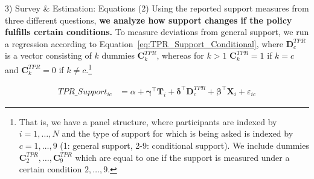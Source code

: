 \documentclass{beamer}
\begin{document}
\begin{frame}{3) Survey \& Estimation: Equations (2)} 
\label{equations2}
Using the reported support measures from three different questions, \textbf{we analyze how support changes if the policy fulfills certain conditions.} To measure deviations from general support, we run a regression according to Equation~\ref{eq:TPR_Support_Conditional}, where %
$\mathbf{D}_c^{TPR}$ is a vector consisting of $k$ dummies $\mathbf{C}_k^{TPR}$, whereas for $k>1$ $\mathbf{C}_k^{TPR}=1$ if $k=c$ and $\mathbf{C}_k^{TPR}=0$ if $k \neq c$.\footnote[7]{That is, we have a panel structure, where participants are indexed by $i=1,\ldots,N$ and the type of support for which is being asked is indexed by $c=1,\ldots,9$ (1: general support, 2-9: conditional support). We include dummies $\mathbf{C}_2^{TPR},\ldots, \mathbf{C}_9^{TPR}$ which are equal to one if the support is measured under a certain condition $2,\ldots,9$.}
\vspace{-0.5cm}
\begin{center}
\begin{align}
    \label{eq:TPR_Support_Conditional}
    \text{$TPR\_Support_{ic}$}
    &= \alpha + \boldsymbol{\gamma}^{\top}\mathbf{T}_i + \boldsymbol{\delta}^{\top}\mathbf{D}_c^{TPR}+ \boldsymbol{\beta}^{\top}\mathbf{X}_{i} + \varepsilon_{ic}
\end{align}
\end{center}
\vfill
\hfill \hyperlink{Example:PolicySupportCond}{} 
\end{frame}
\end{document}
